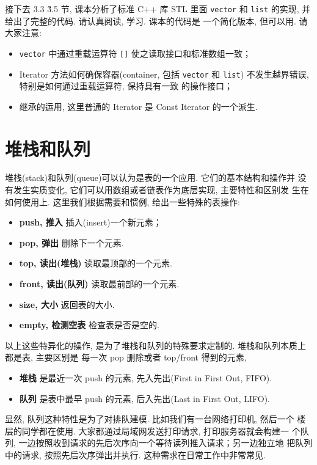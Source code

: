 \documentclass[a4paper]{ctexart}
\theoremstyle{definition}
\theoremstyle{definition}
\begin{document}
接下去 3.3 \~ 3.5 节, 课本分析了标准 C++ 库 STL 里面 \verb|vector| 和
\verb|list| 的实现, 并给出了完整的代码. 请认真阅读, 学习. 课本的代码是
一个简化版本, 但可以用. 请大家注意:

\begin{itemize}
\item \verb|vector| 中通过重载运算符 \verb|[]| 使之读取接口和标准数组一致；
\item Iterator 方法如何确保容器(container, 包括 \verb|vector| 和
  \verb|list|) 不发生越界错误, 特别是如何通过重载运算符, 保持具有一致
  的操作接口；
\item 继承的运用, 这里普通的 Iterator 是 Const Iterator 的一个派生. 
\end{itemize}

\section{堆栈和队列}

堆栈(stack)和队列(queue)可以认为是表的一个应用. 它们的基本结构和操作并
没有发生实质变化, 它们可以用数组或者链表作为底层实现, 主要特性和区别发
生在如何使用上. 这里我们根据需要和惯例, 给出一些特殊的表操作:
\begin{itemize}
  \item {\bf push, 推入} 插入(insert)一个新元素；
  \item {\bf pop, 弹出} 删除下一个元素. 
  \item {\bf top, 读出(堆栈)} 读取最顶部的一个元素.
  \item {\bf front, 读出(队列)} 读取最前部的一个元素.
  \item {\bf size, 大小} 返回表的大小.
  \item {\bf empty, 检测空表} 检查表是否是空的.
  
\end{itemize}

以上这些特异化的操作, 是为了堆栈和队列的特殊要求定制的. 堆栈和队列本质上都是表, 主要区别是
每一次 pop 删除或者 top/front 得到的元素,
\begin{itemize}
\item {\bf 堆栈} 是最近一次 push 的元素, 先入先出(First in First Out,
  FIFO).
\item {\bf 队列} 是表中最早 push 的元素, 后入先出(Last in First Out,
  LIFO).
\end{itemize}

显然, 队列这种特性是为了对排队建模. 比如我们有一台网络打印机, 然后一个
楼层的同学都在使用. 大家都通过局域网发送打印请求, 打印服务器就会构建一
个队列, 一边按照收到请求的先后次序向一个等待读列推入请求；另一边独立地
把队列中的请求, 按照先后次序弹出并执行. 这种需求在日常工作中非常常见.
\end{document}
